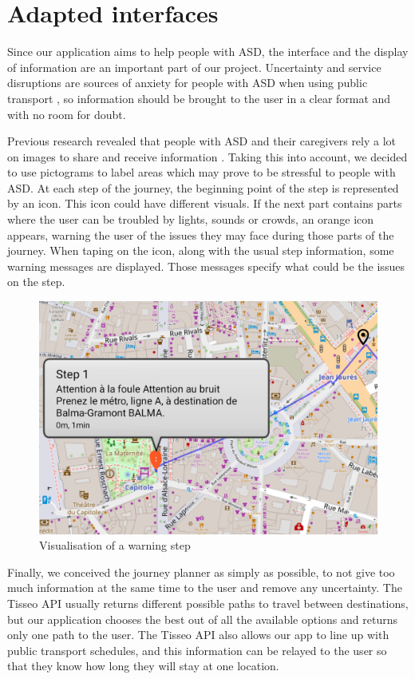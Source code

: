 \section{Adapted interfaces}


Since our application aims to help people with ASD, the interface and the display of information are an important part of our project. Uncertainty and service disruptions are sources of anxiety for people with ASD when using public transport \cite{2020ExperiencesYoungAutistic}, so information should be brought to the user in a clear format and with no room for doubt.


Previous research revealed that people with ASD and their caregivers rely a lot on images to share and receive information \cite{2018MobilityPoliciesExtraSmall}. Taking this into account, we decided to use pictograms to label areas which may prove to be stressful to people with ASD. At each step of the journey, the beginning point of the step is represented by an icon. This icon could have different visuals. If the next part contains parts where the user can be troubled by lights, sounds or crowds, an orange icon appears, warning the user of the issues they may face during those parts of the journey. When taping on the icon, along with the usual step information, some warning messages are displayed. Those messages specify what could be the issues on the step.


\begin{figure}[h]
    \centering
    \includegraphics[scale=0.3]{img/step warning.png}
    \caption{Visualisation of a warning step}
    \label{fig:WarningStep}
\end{figure}


Finally, we conceived the journey planner as simply as possible, to not give too much information at the same time to the user and remove any uncertainty. The Tisseo API usually returns different possible paths to travel between destinations, but our application chooses the best out of all the available options and returns only one path to the user. The Tisseo API also allows our app to line up with public transport schedules, and this information can be relayed to the user so that they know how long they will stay at one location.
